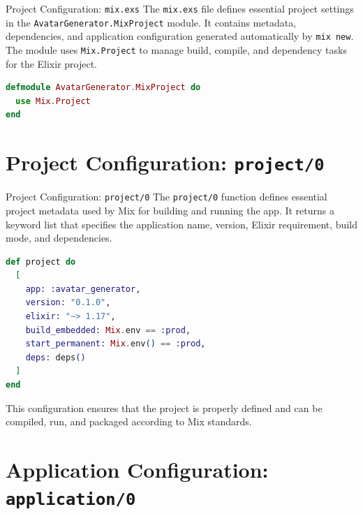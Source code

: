 \documentclass[aspectratio=169, table]{beamer}
\begin{document}
\begin{frame}[fragile]{Project Configuration: \texttt{mix.exs}}
\vspace{20pt}
\small
The \texttt{mix.exs} file defines essential project settings in the \texttt{AvatarGenerator.MixProject} module.  
It contains metadata, dependencies, and application configuration generated automatically by \texttt{mix new}.  
The module uses \texttt{Mix.Project} to manage build, compile, and dependency tasks for the Elixir project.

\begin{lstlisting}[language=Elixir, basicstyle=\ttfamily\scriptsize]
defmodule AvatarGenerator.MixProject do
  use Mix.Project
end
\end{lstlisting}
\end{frame}

\section{Project Configuration: \texttt{project/0}}

\begin{frame}[fragile]{Project Configuration: \texttt{project/0}}
\vspace{20pt}
\small
The \texttt{project/0} function defines essential project metadata used by Mix for building and running the app.  
It returns a keyword list that specifies the application name, version, Elixir requirement, build mode, and dependencies.

\begin{lstlisting}[language=Elixir, basicstyle=\ttfamily\scriptsize]
def project do
  [
    app: :avatar_generator,
    version: "0.1.0",
    elixir: "~> 1.17",
    build_embedded: Mix.env == :prod,
    start_permanent: Mix.env() == :prod,
    deps: deps()
  ]
end
\end{lstlisting}

This configuration ensures that the project is properly defined and can be compiled,  
run, and packaged according to Mix standards.
\end{frame}


\section{Application Configuration: \texttt{application/0}}
\end{document}
